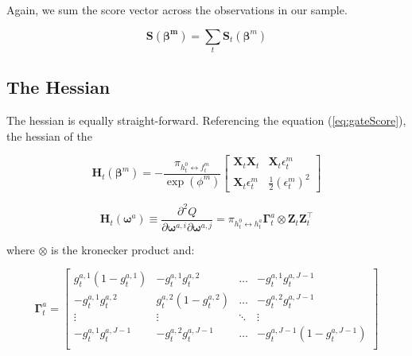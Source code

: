\documentclass[12pt]{article}
\newcommand{\bw}[1]{\boldsymbol{\omega}^{#1}}
\newcommand{\Ht}[1]{\mathbf{H}_{t}(#1)}
\newcommand{\gateprod}[2]{\pi_{#1 \longleftrightarrow #2}}
\begin{document}
Again, we sum the score vector across the observations in our sample. 

\begin{equation}
  \boldsymbol{S}(\boldsymbol{\beta^{m}}) = \sum_{t} \boldsymbol{S}_{t}(\boldsymbol{\beta}^{m})
\end{equation}

\bigskip



\subsection{The Hessian}

The hessian is equally straight-forward. Referencing the equation
(\ref{eq:gateScore}), the hessian of the 

\begin{equation}
  \Ht{\boldsymbol{\beta}^{m}} = - \frac{\gateprod{h^{0}_{t}}{f^{m}_{t}}}{\exp{(\phi^{m})}} \begin{bmatrix}
  \boldsymbol{X}_{t} \boldsymbol{X}_{t}     &  \boldsymbol{X}_{t} \epsilon^{m}_{t}     \\
  \boldsymbol{X}_{t} \epsilon^{m}_{t}       &  \frac{1}{2} (\epsilon^{m}_{t})^{2}
    \end{bmatrix}
\end{equation}




\begin{equation} \label{eq:nodehessian}
  \Ht{\bw{a}} \equiv \frac{\partial^{2} Q}{\partial \boldsymbol{\omega}^{a,i} \partial \boldsymbol{\omega}^{a,j}} = \gateprod{h^{0}_{t}}{h^{a}_{t}} \boldsymbol{\Gamma}^{a}_{t} \otimes  \boldsymbol{Z}_{t} \boldsymbol{Z}_{t}^\top
\end{equation}

where $\otimes$ is the kronecker product and:

\begin{equation}
  \boldsymbol{\Gamma}^{a}_{t} = \begin{bmatrix}
  g_{t}^{a,1}(1-g_{t}^{a,1}) & -g_{t}^{a,1}g_{t}^{a,2}    & \dots  & -g_{t}^{a,1}g_{t}^{a,J-1}       \\
  -g_{t}^{a,1}g_{t}^{a,2}    & g_{t}^{a,2}(1-g_{t}^{a,2}) & \dots  & -g_{t}^{a,2}g_{t}^{a,J-1}       \\
  \vdots                     &  \vdots                    & \ddots & \vdots                 \\
  -g_{t}^{a,1}g_{t}^{a,J-1}  & -g_{t}^{a,2}g_{t}^{a,J-1}  & \dots  & -g_{t}^{a,J-1}(1-g_{t}^{a,J-1}) \\
    \end{bmatrix}
\end{equation}
\end{document}
